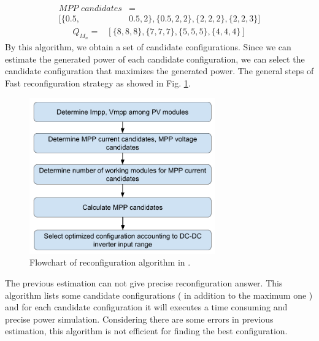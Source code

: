 \documentclass[conference]{IEEEtran}
\begin{document}
\begin{equation}
\begin{aligned}
\textit{MPP candidates}& = \\ [\{ 0.5, &0.5, 2\}, \{0.5, 2, 2\}, \{2, 2, 2\}, \{2, 2, 3\}]
\end{aligned}\label{mpp}
\end{equation}
\begin{equation}
\begin{aligned}
\textit{$Q_{M_n}$} = &  [\{8, 8, 8\}, \{7, 7, 7\}, \{5, 5, 5\}, \{4, 4, 4\}]
\end{aligned}
\label{qmn}
\end{equation}
By this algorithm, we obtain a set of candidate configurations. Since we can estimate the generated power of each candidate configuration, we can select the candidate configuration that maximizes the generated power.
The general steps of Fast reconfiguration strategy as showed in Fig. \ref{flowchart}. 
\begin{figure}[htbp]
\centerline{\includegraphics[width=8cm]{flowchart.png}}
\caption{Flowchart of reconfiguration algorithm in \cite{b10}.}
\label{flowchart}
\end{figure}
The previous estimation can not give precise reconfiguration answer. This algorithm lists some candidate configurations ( in addition to the maximum one ) and for each candidate configuration it will executes a time consuming and precise power simulation. Considering there are some errors in previous estimation, this algorithm is not efficient for finding the best configuration. 
\end{document}
